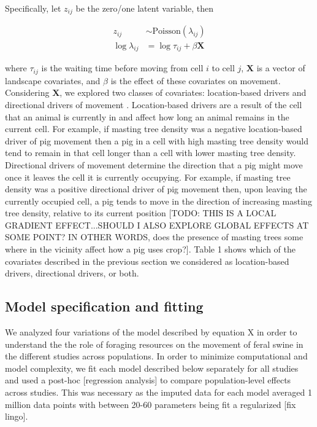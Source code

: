 \documentclass[a4paper]{article}
\begin{document}
Specifically, let $z_{ij}$ be the zero/one latent variable, then

\begin{align}
  z_{ij} &\sim \text{Poisson}(\lambda_{ij}) \\
  \log \lambda_{ij} &= \log{\tau_{ij}} + \beta \mathbf{X}
\end{align}

where $\tau_{ij}$ is the waiting time before moving from cell $i$ to cell $j$, $\mathbf{X}$ is a vector of landscape covariates, and $\beta$ is the effect of these covariates on movement.  Considering $\mathbf{X}$, we explored two classes of covariates: location-based drivers and directional drivers of movement \citep{Hanks2015}.  Location-based drivers are a result of the cell that an animal is currently in and affect how long an animal remains in the current cell.  For example, if masting tree density was a negative location-based driver of pig movement then a pig in a cell with high masting tree density would tend to remain in that cell longer than a cell with lower masting tree density. Directional drivers of movement determine the direction that a pig might move once it leaves the cell it is currently occupying.  For example, if masting tree density was a positive directional driver of pig movement then, upon leaving the currently occupied cell, a pig tends to move in the direction of increasing masting tree density, relative to its current position [TODO: THIS IS A LOCAL GRADIENT EFFECT...SHOULD I ALSO EXPLORE GLOBAL EFFECTS AT SOME POINT? IN OTHER WORDS, does the presence of masting trees some where in the vicinity affect how a pig uses crop?]. Table 1 shows which of the covariates described in the previous section we considered as location-based drivers, directional drivers, or both.  

\subsection*{Model specification and fitting}

We analyzed four variations of the model described by equation X in order to understand the the role of foraging resources on the movement of feral swine in the different studies across populations.  In order to minimize computational and model complexity, we fit each model described below separately for all studies and used a post-hoc [regression analysis] to compare population-level effects across studies.  This was necessary as the imputed data for each model averaged 1 million data points with between 20-60 parameters being fit a regularized [fix lingo].
\end{document}

